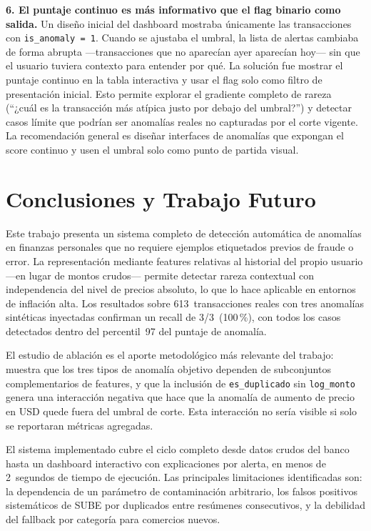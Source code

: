 \documentclass[conference]{IEEEtran}
\begin{document}
\textbf{6. El puntaje continuo es m\'as informativo que el flag binario como salida.}
Un dise\~no inicial del dashboard mostraba \'unicamente las transacciones con
\texttt{is\_anomaly\,=\,1}. Cuando se ajustaba el umbral, la lista de alertas
cambiaba de forma abrupta ---transacciones que no aparec\'ian ayer aparec\'ian hoy---
sin que el usuario tuviera contexto para entender por qu\'e. La soluci\'on fue
mostrar el puntaje continuo en la tabla interactiva y usar el flag solo como filtro
de presentaci\'on inicial. Esto permite explorar el gradiente completo de rareza
(``¿cu\'al es la transacci\'on m\'as at\'ipica justo por debajo del umbral?'') y
detectar casos l\'imite que podr\'ian ser anomal\'ias reales no capturadas por el
corte vigente. La recomendaci\'on general es dise\~nar interfaces de anomal\'ias que
expongan el score continuo y usen el umbral solo como punto de partida visual.

\section{Conclusiones y Trabajo Futuro}
\label{sec:conclusiones}

Este trabajo presenta un sistema completo de detecci\'on autom\'atica de anomal\'ias
en finanzas personales que no requiere ejemplos etiquetados previos de fraude o error.
La representaci\'on mediante features relativas al historial del propio usuario
---en lugar de montos crudos--- permite detectar rareza contextual con independencia
del nivel de precios absoluto, lo que lo hace aplicable en entornos de inflaci\'on
alta. Los resultados sobre 613~transacciones reales con tres anomal\'ias sint\'eticas
inyectadas confirman un recall de 3/3~(100\,\%), con todos los casos detectados dentro
del percentil~97 del puntaje de anomal\'ia.

El estudio de ablaci\'on es el aporte metodol\'ogico m\'as relevante del trabajo:
muestra que los tres tipos de anomal\'ia objetivo dependen de subconjuntos
complementarios de features, y que la inclusi\'on de \texttt{es\_duplicado} sin
\texttt{log\_monto} genera una interacci\'on negativa que hace que la anomal\'ia de
aumento de precio en USD quede fuera del umbral de corte. Esta interacci\'on no
ser\'ia visible si solo se reportaran m\'etricas agregadas.

El sistema implementado cubre el ciclo completo desde datos crudos del banco hasta
un dashboard interactivo con explicaciones por alerta, en menos de 2~segundos de
tiempo de ejecuci\'on. Las principales limitaciones identificadas son: la dependencia
de un par\'ametro de contaminaci\'on arbitrario, los falsos positivos sistem\'aticos
de SUBE por duplicados entre res\'umenes consecutivos, y la debilidad del fallback
por categor\'ia para comercios nuevos.
\end{document}
